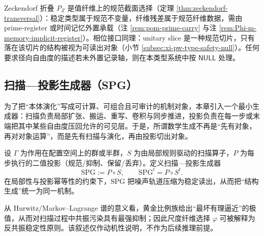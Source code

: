 \begin{remark}\label{rem:pom-gauge-zeck-phase-null}
Zeckendorf 折叠 \(P_Z\) 是值纤维上的规范截面选择（定理 \ref{thm:zeckendorf-transversal}）：稳定类型属于规范不变量，纤维残差属于规范纤维数据，需由 prime-register 或时间记忆外置承载（注 \ref{rem:pom-prime-carry} 与注 \ref{rem:Phi-m-memory-implicit-register}）。相位接口同理：unitary slice 是一种规范切片，只有落在该切片的结构被视为可读出对象（小节 \ref{subsec:xi-pw-type-safety-null}）。任何要求径向自由度的描述若未外置记录轴，则在本类型系统中按 \(\mathsf{NULL}\) 处理。
\end{remark}


\subsection{扫描—投影生成器（SPG）}\label{subsec:pom-spg}
为了把“本体演化”写成可计算、可组合且可审计的机制对象，本章引入一个最小生成器：扫描负责局部扩张、搬运、重写、卷积与同步推进，投影负责在每一步或末端把其中某些自由度压回允许的可见层。于是，所谓数学生成不再是“先有对象，再对对象运算”，而是先有扫描与演化，再由投影切出对象。

\begin{definition}[扫描—投影生成器]\label{def:pom-spg}
设 $\Gamma$ 为作用在配置空间上的群或半群，$S$ 为由局部规则驱动的扫描算子，$P$ 为每步执行的二值投影（规范/抑制、保留/丢弃）。定义扫描—投影生成器
\[
\mathrm{SPG}:=P\circ S,
\qquad
\mathrm{SPG}^t=P\circ S^t.
\]
在局部性与投影幂等性的约束下，$\mathrm{SPG}$ 把噪声轨道压缩为稳定读出，从而把“结构生成”统一为同一机制。
\end{definition}
\begin{remark}\label{rem:pom-anti-resonance}
从 Hurwitz/Markov--Lagrange 谱的意义看，黄金比例族给出“最坏有理逼近”的极值，从而对扫描过程中共振污染具有最强抑制；因此尺度纤维选择 $\varphi$ 可被解释为反共振稳定性原则。该叙述仅作动机性说明，不作为后续推理前提。
\end{remark}

